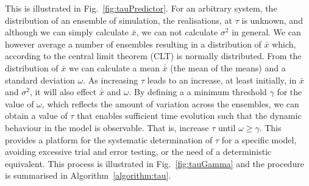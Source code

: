 \documentclass[11pt]{article}
\begin{document}
This is illustrated in Fig.~\ref{fig:tauPredictor}. For an arbitrary system, the distribution of 
an ensemble of simulation, the realisations, at $\tau$ is unknown, and although we can simply calculate $\bar{x}$, we can not calculate $\sigma^2$ in general. We can however average a number of ensembles resulting in a distribution 
of $\bar{x}$ which, according to the central limit theorem (CLT) is normally distributed. From the 
distribution of $\bar{x}$ we can calculate a mean $\overline{\bar{x}}$ (the mean of the means) and a 
standard deviation $\omega$. As increasing $\tau$ leads to an increase, at least initially, in
$\bar{x}$ and $\sigma^2$, it will also effect $\overline{\bar{x}}$ and $\omega$. By defining a a minimum 
threshold $\gamma$ for the value of $\omega$, which reflects the amount of variation across the ensembles, 
we can obtain a value of $\tau$ that enables sufficient time evolution such that the dynamic behaviour in
the model is observable. That is, increase $\tau$ until $\omega \geq \gamma$. This provides a platform for 
the systematic determination of $\tau$ for a specific model, avoiding excessive trial and error testing, or the need of a deterministic equivalent. This process is illustrated in Fig.~\ref{fig:tauGamma} 
and the procedure is summarised in Algorithm~\ref{algorithm:tau}. 
\end{document}
